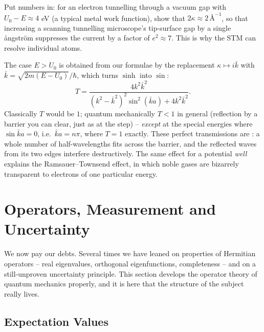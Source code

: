 \documentclass[a4paper]{scrartcl}
\begin{document}
\begin{exercise}
    Put numbers in: for an electron tunnelling through a vacuum gap with $U_0 - E \approx 4$ eV (a typical metal work function), show that $2\kappa \approx 2 \, \text{\AA}^{-1}$, so that increasing a scanning tunnelling microscope's tip-surface gap by a single \aa ngstr\"om suppresses the current by a factor of $e^2 \approx 7$. This is why the STM can resolve individual atoms.
\end{exercise}

\begin{remark}
    The case $E > U_0$ is obtained from our formulae by the replacement $\kappa \mapsto i \bar{k}$ with $\bar{k} = \sqrt{2m(E - U_0)}/\hbar$, which turns $\sinh$ into $\sin$:
    $$
    T = \frac{4 k^2 \bar{k}^2}{(k^2 - \bar{k}^2)^2 \sin^2(\bar{k} a) + 4 k^2 \bar{k}^2}.
    $$
    Classically $T$ would be $1$; quantum mechanically $T < 1$ in general (reflection by a barrier you can clear, just as at the step) -- \emph{except} at the special energies where $\sin \bar{k} a = 0$, i.e.\ $\bar{k} a = n \pi$, where $T = 1$ exactly. These perfect transmissions are : a whole number of half-wavelengths fits across the barrier, and the reflected waves from its two edges interfere destructively. The same effect for a potential \emph{well} explains the Ramsauer--Townsend effect, in which noble gases are bizarrely transparent to electrons of one particular energy.
\end{remark}

\section{Operators, Measurement and Uncertainty}

We now pay our debts. Several times we have leaned on properties of Hermitian operators -- real eigenvalues, orthogonal eigenfunctions, completeness -- and on a still-unproven uncertainty principle. This section develops the operator theory of quantum mechanics properly, and it is here that the structure of the subject really lives.

\subsection{Expectation Values}
\end{document}
